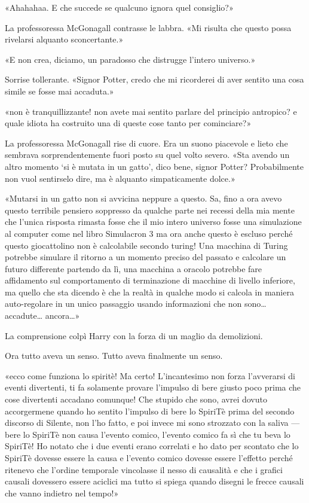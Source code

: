 «Ahahahaa. E che succede se qualcuno ignora quel consiglio?»

La professoressa McGonagall contrasse le labbra. «Mi risulta che questo possa rivelarsi alquanto sconcertante.»

«E non crea, diciamo, un paradosso che distrugge l’intero universo.»

Sorrise tollerante. «Signor Potter, credo che mi ricorderei di aver sentito una cosa simile se fosse mai accaduta.»

«non è tranquillizzante! non avete mai sentito parlare del principio antropico? e quale idiota ha costruito una di queste cose tanto per cominciare?»

La professoressa McGonagall rise di cuore. Era un suono piacevole e lieto che sembrava sorprendentemente fuori posto su quel volto severo. «Sta avendo un altro momento ‘si è mutata in un gatto’, dico bene, signor Potter? Probabilmente non vuol sentirselo dire, ma è alquanto simpaticamente dolce.»

«Mutarsi in un gatto non si avvicina neppure a questo. Sa, fino a ora avevo questo terribile pensiero soppresso da qualche parte nei recessi della mia mente che l’unica risposta rimasta fosse che il mio intero universo fosse una simulazione al computer come nel libro Simulacron 3 ma ora anche questo è escluso perché questo giocattolino non è calcolabile secondo turing! Una macchina di Turing potrebbe simulare il ritorno a un momento preciso del passato e calcolare un futuro differente partendo da lì, una macchina a oracolo potrebbe fare affidamento sul comportamento di terminazione di macchine di livello inferiore, ma quello che sta dicendo è che la realtà in qualche modo si calcola in maniera auto-regolare in un unico passaggio usando informazioni che non sono… accadute… ancora…»

La comprensione colpì Harry con la forza di un maglio da demolizioni.

Ora tutto aveva un senso. Tutto aveva finalmente un senso.

«ecco come funziona lo spiritè! Ma certo! L’incantesimo non forza l’avverarsi di eventi divertenti, ti fa solamente provare l’impulso di bere giusto poco prima che cose divertenti accadano comunque! Che stupido che sono, avrei dovuto accorgermene quando ho sentito l’impulso di bere lo SpiriTè prima del secondo discorso di Silente, non l’ho fatto, e poi invece mi sono strozzato con la saliva — bere lo SpiriTè non causa l’evento comico, l’evento comico fa sì che tu beva lo SpiriTè! Ho notato che i due eventi erano correlati e ho dato per scontato che lo SpiriTè dovesse essere la causa e l’evento comico dovesse essere l’effetto perché ritenevo che l’ordine temporale vincolasse il nesso di causalità e che i grafici causali dovessero essere aciclici ma tutto si spiega quando disegni le frecce causali che vanno indietro nel tempo!»

